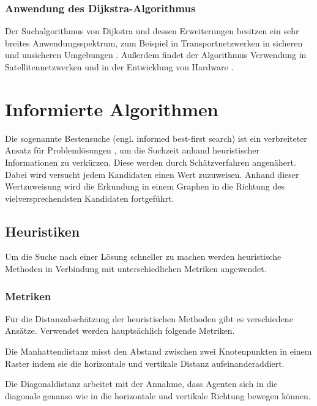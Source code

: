 \subsubsection{Anwendung des Dijkstra-Algorithmus }

Der Suchalgorithmus von Dijkstra und dessen Erweiterungen besitzen ein sehr breites Anwendungsspektrum, zum Beispiel in Transportnetzwerken in sicheren und unsicheren Umgebungen \cite{fuzzyDijk} \cite{publicTrans} %
. Außerdem findet der Algorithmus Verwendung in Satellitennetzwerken \cite{satelite} und in der Entwicklung von Hardware \cite{hardware}.  %

\section{Informierte Algorithmen}

Die sogenannte Bestensuche (engl. informed best-first search)  %
ist ein verbreiteter Ansatz für Problemlösungen %
, um die Suchzeit %
anhand heuristischer Informationen zu verkürzen. Diese %
werden durch Schätzverfahren angenähert. Dabei wird versucht jedem Kandidaten %
einen Wert zuzuweisen. Anhand dieser Wertzuweisung wird die Erkundung in einem Graphen in die Richtung des vielversprechendsten Kandidaten fortgeführt. 
\subsection{Heuristiken}
Um die Suche nach einer Lösung schneller zu machen werden heuristische Methoden in Verbindung mit unterschiedlichen Metriken angewendet. 
\subsubsection{Metriken}
Für die Distanzabschätzung der heuristischen Methoden gibt es verschiedene Ansätze. Verwendet werden hauptsächlich folgende Metriken.

Die Manhattendistanz misst den Abstand zwischen zwei Knotenpunkten in einem Raster indem sie die horizontale und vertikale Distanz aufeinanderaddiert.

Die Diagonaldistanz arbeitet mit der Annahme, dass Agenten sich in die diagonale genauso wie in die horizontale und vertikale Richtung bewegen können. 

